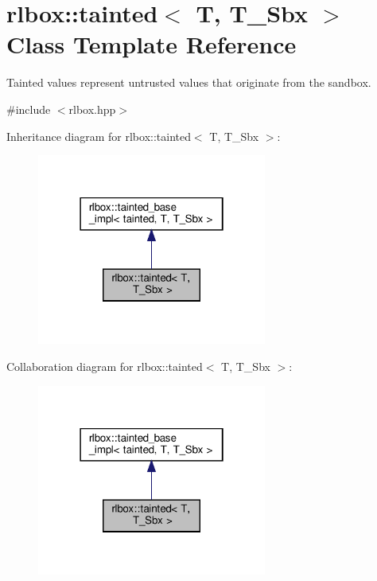 \hypertarget{classrlbox_1_1tainted}{}\section{rlbox\+:\+:tainted$<$ T, T\+\_\+\+Sbx $>$ Class Template Reference}
\label{classrlbox_1_1tainted}


Tainted values represent untrusted values that originate from the sandbox.  




{\ttfamily \#include $<$rlbox.\+hpp$>$}



Inheritance diagram for rlbox\+:\+:tainted$<$ T, T\+\_\+\+Sbx $>$\+:
\nopagebreak
\begin{figure}[H]
\begin{center}
\leavevmode
\includegraphics[width=214pt]{classrlbox_1_1tainted__inherit__graph}
\end{center}
\end{figure}


Collaboration diagram for rlbox\+:\+:tainted$<$ T, T\+\_\+\+Sbx $>$\+:
\nopagebreak
\begin{figure}[H]
\begin{center}
\leavevmode
\includegraphics[width=214pt]{classrlbox_1_1tainted__coll__graph}
\end{center}
\end{figure}
